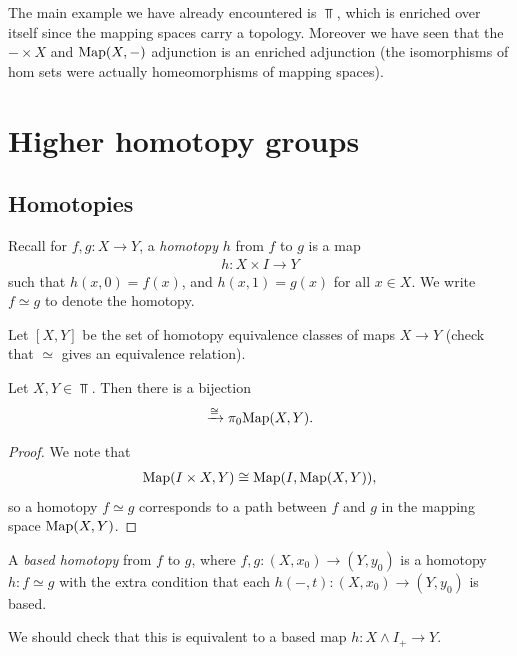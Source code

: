 \documentclass{article}[11pt]
\newcommand{\smashprod}{\wedge} %
\begin{document}
\begin{example}
The main example we have already encountered is $\Top$, which is enriched over itself since the mapping spaces carry a topology. Moreover we have seen that the $-\times X$ and $\textup{Map}(X, -)$ adjunction is an enriched adjunction (the isomorphisms of hom sets were actually homeomorphisms of mapping spaces).
\end{example}


\section{Higher homotopy groups}
\subsection{Homotopies}
Recall for $f,g : X \to Y$, a \textit{homotopy} $h$ from $f$ to $g$ is a map
\begin{align*}
	h : X\times I \to Y
\end{align*}
such that $h(x,0) = f(x)$, and $h(x,1) = g(x)$ for all $x\in X$. We write $f\simeq g$ to denote the homotopy.

\begin{definition} Let $[X,Y]$ be the set of homotopy equivalence classes of maps $X\to Y$ (check that $\simeq$ gives an equivalence relation).
\end{definition}

\begin{proposition} Let $X,Y \in \Top$. Then there is a bijection
\begin{align*}
	[X,Y] \xto{\cong} \pi_0 \Map(X,Y).
\end{align*}
\end{proposition}
\begin{proof} We note that
\begin{align*}
	\textup{Map}(I\times X, Y) \cong \textup{Map}(I, \textup{Map}(X,Y)),
\end{align*}
so a homotopy $f\simeq g$ corresponds to a path between $f$ and $g$ in the mapping space $\textup{Map}(X,Y)$.
\end{proof}

\begin{definition}\label{def:based-homotopy} A \textit{based homotopy} from $f$ to $g$, where $f,g : (X,x_0) \to (Y,y_0)$ is a homotopy $h:f\simeq g$ with the extra condition that each $h(-,t) : (X,x_0) \to (Y,y_0)$ is based.

We should check that this is equivalent to a based map $h : X \smashprod I_+ \to Y$.
\end{definition}
\end{document}
